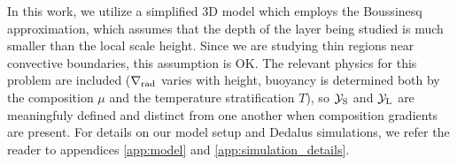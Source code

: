 In this work, we utilize a simplified 3D model which employs the Boussinesq approximation, which assumes that the depth of the layer being studied is much smaller than the local scale height.
Since we are studying thin regions near convective boundaries, this assumption is OK.
The relevant physics for this problem are included ($\nabla_{\rm{rad}}$ varies with height, buoyancy is determined both by the composition $\mu$ and the temperature stratification $T$), so $\mathcal{Y}_{\rm{S}}$ and $\mathcal{Y}_{\rm{L}}$ are meaningfuly defined and distinct from one another when composition gradients are present.
For details on our model setup and Dedalus simulations, we refer the reader to appendices \ref{app:model} and \ref{app:simulation_details}.
